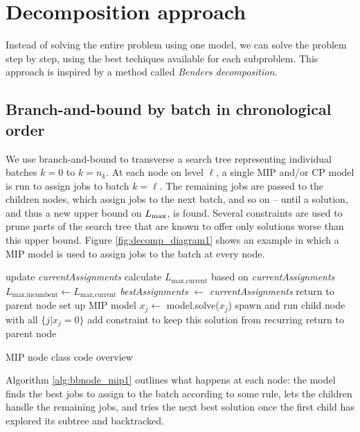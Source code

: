 \section{Decomposition approach}

Instead of solving the entire problem using one model, we can solve the problem
step by step, using the best techiques available for each subproblem. This
approach is inspired by a method called \textit{Benders decomposition}.

\subsection{Branch-and-bound by batch in chronological
order}\label{sec:mipdecomp}
We use branch-and-bound to transverse a search
tree representing individual batches $k=0$ to $k=n_k$. At each node on level $\ell$, a single MIP and/or CP model is run to
assign jobs to batch $k = \ell$. The remaining jobs are passed to the children
nodes, which assign jobs to the next batch, and so on -- until a solution, and
thus a new upper bound on $L_{\text{max}}$, is found. Several constraints are used to
prune parts of the search tree that are known to offer only solutions worse than
this upper bound. Figure \ref{fig:decomp_diagram1} shows an example in which a
MIP model is used to assign jobs to the batch at every node.
\begin{algorithm}[h]
\fontsize{9pt}{11.5pt}\selectfont
\begin{algorithmic}
\State update \textit{currentAssignments} 
 
  \State calculate $L_{\text{max,current}}$ based on \textit{currentAssignments}
    \State $L_{\text{max,incumbent}} \gets L_{\text{max,current}}$
    \State \textit{bestAssignments} $\gets$ \textit{currentAssignments}
  \EndIf
  \State return to parent node
\EndIf
\State set up MIP model 
\Repeat
  \State $x_j \gets$ model.solve($x_j$) 
  \State spawn and run child node with all $\{j | x_j = 0\}$ 
  \State add constraint to keep this solution from recurring 
\State return to parent node
\end{algorithmic}
\caption{MIP node class code overview}
\label{alg:bbnode_mip1}
\end{algorithm}
Algorithm \ref{alg:bbnode_mip1} outlines what happens at each node: the model
finds the best jobs to assign to the batch according to some rule, lets the
children handle the remaining jobs, and tries the next best solution once the
first child has explored its subtree and backtracked.

